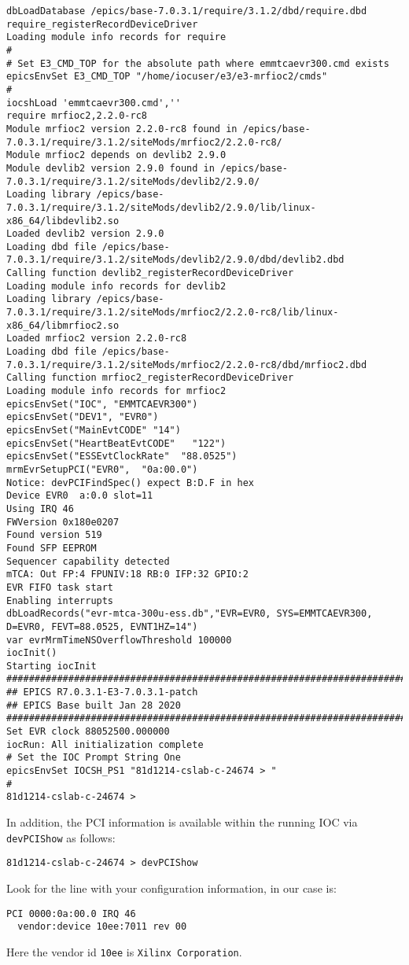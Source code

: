 \documentclass[11pt
  , a4paper
  , article
  , oneside
  , showtrims
]{memoir}
\begin{document}
{\begin{lstlisting}[style=termstyle]
dbLoadDatabase /epics/base-7.0.3.1/require/3.1.2/dbd/require.dbd
require_registerRecordDeviceDriver
Loading module info records for require
#
# Set E3_CMD_TOP for the absolute path where emmtcaevr300.cmd exists
epicsEnvSet E3_CMD_TOP "/home/iocuser/e3/e3-mrfioc2/cmds"
#
iocshLoad 'emmtcaevr300.cmd',''
require mrfioc2,2.2.0-rc8
Module mrfioc2 version 2.2.0-rc8 found in /epics/base-7.0.3.1/require/3.1.2/siteMods/mrfioc2/2.2.0-rc8/
Module mrfioc2 depends on devlib2 2.9.0
Module devlib2 version 2.9.0 found in /epics/base-7.0.3.1/require/3.1.2/siteMods/devlib2/2.9.0/
Loading library /epics/base-7.0.3.1/require/3.1.2/siteMods/devlib2/2.9.0/lib/linux-x86_64/libdevlib2.so
Loaded devlib2 version 2.9.0
Loading dbd file /epics/base-7.0.3.1/require/3.1.2/siteMods/devlib2/2.9.0/dbd/devlib2.dbd
Calling function devlib2_registerRecordDeviceDriver
Loading module info records for devlib2
Loading library /epics/base-7.0.3.1/require/3.1.2/siteMods/mrfioc2/2.2.0-rc8/lib/linux-x86_64/libmrfioc2.so
Loaded mrfioc2 version 2.2.0-rc8
Loading dbd file /epics/base-7.0.3.1/require/3.1.2/siteMods/mrfioc2/2.2.0-rc8/dbd/mrfioc2.dbd
Calling function mrfioc2_registerRecordDeviceDriver
Loading module info records for mrfioc2
epicsEnvSet("IOC", "EMMTCAEVR300")
epicsEnvSet("DEV1", "EVR0")
epicsEnvSet("MainEvtCODE" "14")
epicsEnvSet("HeartBeatEvtCODE"   "122")
epicsEnvSet("ESSEvtClockRate"  "88.0525")
mrmEvrSetupPCI("EVR0",  "0a:00.0")
Notice: devPCIFindSpec() expect B:D.F in hex
Device EVR0  a:0.0 slot=11
Using IRQ 46
FWVersion 0x180e0207
Found version 519
Found SFP EEPROM
Sequencer capability detected
mTCA: Out FP:4 FPUNIV:18 RB:0 IFP:32 GPIO:2
EVR FIFO task start
Enabling interrupts
dbLoadRecords("evr-mtca-300u-ess.db","EVR=EVR0, SYS=EMMTCAEVR300, D=EVR0, FEVT=88.0525, EVNT1HZ=14")
var evrMrmTimeNSOverflowThreshold 100000
iocInit()
Starting iocInit
############################################################################
## EPICS R7.0.3.1-E3-7.0.3.1-patch
## EPICS Base built Jan 28 2020
############################################################################
Set EVR clock 88052500.000000
iocRun: All initialization complete
# Set the IOC Prompt String One
epicsEnvSet IOCSH_PS1 "81d1214-cslab-c-24674 > "
#
81d1214-cslab-c-24674 >
\end{lstlisting}

In addition, the PCI information is available within the running IOC via \texttt{devPCIShow} as follows:
\begin{lstlisting}
81d1214-cslab-c-24674 > devPCIShow
\end{lstlisting}
Look for the line with your configuration information, in our case is:
\begin{lstlisting}
PCI 0000:0a:00.0 IRQ 46
  vendor:device 10ee:7011 rev 00
\end{lstlisting}
Here the vendor id \texttt{10ee} is \texttt{Xilinx Corporation}.\\

}
\end{document}
